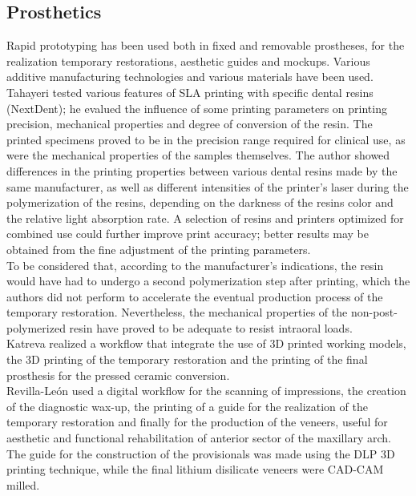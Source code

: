 \subsection{Prosthetics}
Rapid prototyping has been used both in fixed and removable prostheses, for the realization temporary restorations, aesthetic guides and mockups. Various additive manufacturing technologies and various materials have been used. \\
Tahayeri \parencite{Reference98} tested various features of SLA printing with specific dental resins (NextDent); he evalued the influence of some printing parameters on printing precision, mechanical properties and degree of conversion of the resin. The printed specimens proved to be in the precision range required for clinical use, as were the mechanical properties of the samples themselves. The author showed differences in the printing properties between various dental resins made by the same manufacturer, as well as different intensities of the printer's laser during the polymerization of the resins, depending on the darkness of the resins color and the relative light absorption rate. A selection of resins and printers optimized for combined use could further improve print accuracy; better results may be obtained from the fine adjustment of the printing parameters. \\
To be considered that, according to the manufacturer's indications, the resin would have had to undergo a second polymerization step after printing, which the authors did not perform to accelerate the eventual production process of the temporary restoration. Nevertheless, the mechanical properties of the non-post-polymerized resin have proved to be adequate to resist intraoral loads. \\
Katreva \parencite{Reference99} realized a workflow that integrate the use of 3D printed working models, the 3D printing of the temporary restoration and the printing of the final prosthesis for the pressed ceramic conversion. \\
Revilla-León \parencite{Reference100} used a digital workflow for the scanning of impressions, the creation of the diagnostic wax-up, the printing of a guide for the realization of the temporary restoration and finally for the production of the veneers, useful for aesthetic and functional rehabilitation of anterior sector of the maxillary arch. The guide for the construction of the provisionals was made using the DLP 3D printing technique, while the final lithium disilicate veneers were CAD-CAM milled. \\
